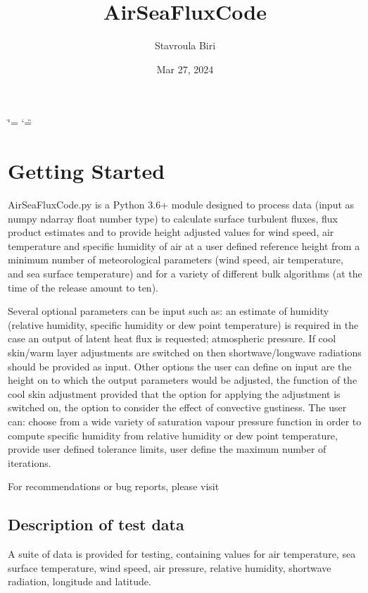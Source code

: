 \documentclass[letterpaper,10pt,english]{sphinxmanual}
\title{AirSeaFluxCode}
\date{Mar 27, 2024}
\author{Stavroula Biri}
\begin{document}
\ifdefined\shorthandoff
  \ifnum\catcode`\=\string=\active\shorthandoff{=}\fi
  \ifnum\catcode`\"=\active{}\fi
\fi

\pagestyle{empty}
\sphinxmaketitle
\pagestyle{plain}
\sphinxtableofcontents
\pagestyle{normal}
\label{\detokenize{index::doc}}


\sphinxstepscope


\chapter{Getting Started}
\label{\detokenize{getting_started:getting-started}}\label{\detokenize{getting_started::doc}}
\sphinxAtStartPar
AirSeaFluxCode.py is a Python 3.6+ module designed to process data (input as numpy ndarray float number type) to calculate surface turbulent fluxes, flux product estimates and to provide height adjusted values for wind speed, air temperature and specific humidity of air at a user defined reference height from a minimum number of meteorological parameters (wind speed, air temperature, and sea surface temperature) and for a variety of different bulk algorithms (at the time of the release amount to ten).

\sphinxAtStartPar
Several optional parameters can be input such as: an estimate of humidity (relative humidity, specific humidity or dew point temperature) is required in the case an output of latent heat flux is requested; atmospheric pressure. If cool skin/warm layer adjustments are switched on then shortwave/longwave radiations should be provided as input. Other options the user can define on input are the height on to which the output parameters would be adjusted, the function of the cool skin adjustment provided that the option for applying the adjustment is switched on, the option to consider the effect of convective gustiness. The user can: choose from a wide variety of saturation vapour pressure function in order to compute specific humidity from relative humidity or dew point temperature, provide user defined tolerance limits, user define the maximum number of iterations.

\sphinxAtStartPar
For recommendations or bug reports, please visit 


\section{Description of test data}
\label{\detokenize{getting_started:description-of-test-data}}
\sphinxAtStartPar
A suite of data is provided for testing, containing values for air temperature, sea surface temperature, wind speed, air pressure, relative humidity, shortwave radiation, longitude and latitude.
\end{document}

